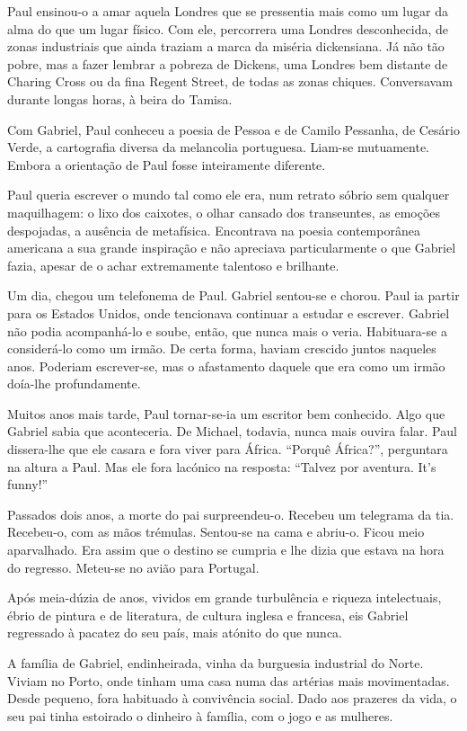 Paul ensinou-o a amar aquela Londres que se pressentia mais como um
lugar da alma do que um lugar físico. Com ele, percorrera uma Londres
desconhecida, de zonas industriais que ainda traziam a marca da miséria
dickensiana. Já não tão pobre, mas a fazer lembrar a pobreza de Dickens,
uma Londres bem distante de Charing Cross ou da fina Regent Street, de
todas as zonas chiques. Conversavam durante longas horas, à beira do
Tamisa.

Com Gabriel, Paul conheceu a poesia de Pessoa e de Camilo Pessanha, de
Cesário Verde, a cartografia diversa da melancolia portuguesa. Liam-se
mutuamente. Embora a orientação de Paul fosse inteiramente diferente.

Paul queria escrever o mundo tal como ele era, num retrato sóbrio sem
qualquer maquilhagem: o lixo dos caixotes, o olhar cansado dos
transeuntes, as emoções despojadas, a ausência de metafísica. Encontrava
na poesia contemporânea americana a sua grande inspiração e não
apreciava particularmente o que Gabriel fazia, apesar de o achar
extremamente talentoso e brilhante.

Um dia, chegou um telefonema de Paul. Gabriel sentou-se e chorou. Paul
ia partir para os Estados Unidos, onde tencionava continuar a estudar e
escrever. Gabriel não podia acompanhá-lo e soube, então, que nunca mais
o veria. Habituara-se a considerá-lo como um irmão. De certa forma,
haviam crescido juntos naqueles anos. Poderiam escrever-se, mas o
afastamento daquele que era como um irmão doía-lhe profundamente.

Muitos anos mais tarde, Paul tornar-se-ia um escritor bem conhecido.
Algo que Gabriel sabia que aconteceria. De Michael, todavia, nunca mais
ouvira falar. Paul dissera-lhe que ele casara e fora viver para África.
``Porquê África?'', perguntara na altura a Paul. Mas ele fora lacónico na
resposta: ``Talvez por aventura. It's funny!''

Passados dois anos, a morte do pai surpreendeu-o. Recebeu um telegrama
da tia. Recebeu-o, com as mãos trémulas. Sentou-se na cama e abriu-o.
Ficou meio aparvalhado. Era assim que o destino se cumpria e lhe dizia
que estava na hora do regresso. Meteu-se no avião para Portugal.

Após meia-dúzia de anos, vividos em grande turbulência e riqueza
intelectuais, ébrio de pintura e de literatura, de cultura inglesa e
francesa, eis Gabriel regressado à pacatez do seu país, mais atónito do
que nunca.

A família de Gabriel, endinheirada, vinha da burguesia industrial do
Norte. Viviam no Porto, onde tinham uma casa numa das artérias mais
movimentadas. Desde pequeno, fora habituado à convivência social. Dado
aos prazeres da vida, o seu pai tinha estoirado o dinheiro à família,
com o jogo e as mulheres.

